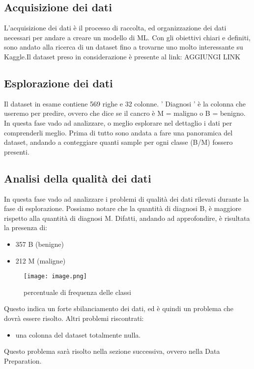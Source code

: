\documentclass{article}
\begin{document}
\subsection{Acquisizione dei dati}
L’acquisizione dei dati è il processo di raccolta, ed organizzazione dei dati necessari per andare a creare un modello di ML. Con gli obiettivi chiari e definiti, sono andato alla ricerca di un dataset fino a trovarne uno molto interessante su Kaggle.Il dataset preso in considerazione è presente al link: AGGIUNGI LINK


\subsection{Esplorazione dei dati}
Il dataset in esame contiene 569 righe e 32 colonne. ' Diagnosi ' è la colonna che useremo per predire, ovvero che dice se il cancro è M = maligno o B = benigno.  In questa fase vado ad analizzare, o meglio esplorare nel dettaglio i dati per comprenderli meglio.
Prima di tutto sono andata a fare una panoramica del dataset, andando a conteggiare quanti sample per ogni classe (B/M) fossero presenti.

\subsection{Analisi della qualità dei dati}
In questa fase vado ad analizzare i problemi di qualità dei dati rilevati durante la fase di esplorazione.
Possiamo  notare che la quantità di diagnosi B, è  maggiore rispetto alla quantità di diagnosi M. Difatti, andando ad approfondire, è risultata la presenza di:
\begin{itemize}
    \item 357 B (benigne)
    \item 212  M (maligne)
\end{itemize}
\begin{figure}
    \centering
    \texttt{[image: image.png]}
    \caption{percentuale di frequenza delle classi}
    \label{fig:enter-label}
\end{figure}
\newpage
Questo indica un forte sbilanciamento dei dati, ed è quindi un problema che dovrà essere risolto.
Altri problemi riscontrati:
\begin{itemize}
    \item una colonna del dataset totalmente nulla.
\end{itemize}
Questo problema sarà risolto nella sezione successiva, ovvero nella Data Preparation.
\end{document}
